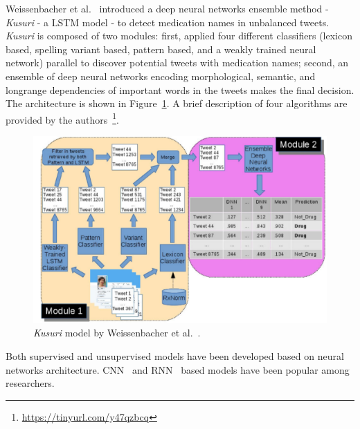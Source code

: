 Weissenbacher et al.~\cite{weissenbacher2019deep} introduced a deep neural networks ensemble method - \textit{Kusuri} - a LSTM model - to detect medication names in unbalanced tweets. \textit{Kusuri} is composed of two modules: first, applied four different classifiers (lexicon based, spelling variant based, pattern based, and a weakly trained neural network) parallel to discover potential tweets with medication names; second, an ensemble of deep neural networks encoding morphological, semantic, and longrange dependencies of important words in the tweets makes the final decision. The architecture is shown in Figure~\ref{fig:architecture-weissenbacher}. A brief description of four algorithms are provided by the authors~\footnote{\url{https://tinyurl.com/y47qzbcq}}. 

\begin{figure}[h]
	\centering
	\includegraphics[width=0.99\linewidth]{Figures/a.png}
	\caption{\textit{Kusuri} model by Weissenbacher et al.~\cite{weissenbacher2019deep}.}
	\label{fig:architecture-weissenbacher}
\end{figure}

Both supervised and unsupervised models have been developed based on neural networks architecture. CNN~\cite{wu2019msa, huynh2016adverse, lee2017adverse} and RNN~\cite{TUTUBALINA201893, huynh2016adverse} based models have been popular among researchers.